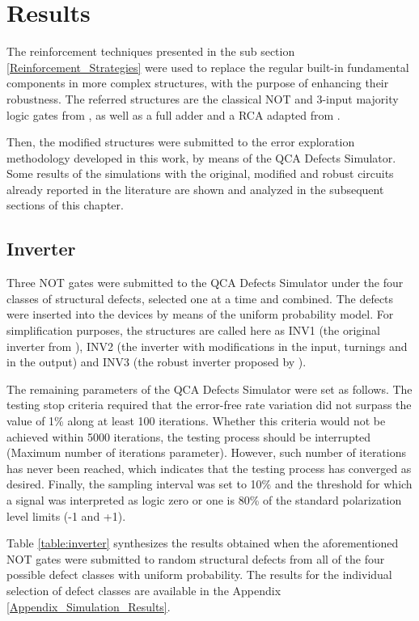 \chapter{Results}
\label{section:Results}

The reinforcement techniques presented in the sub section \ref{Reinforcement_Strategies} were used to replace the regular built-in fundamental components in more complex structures, with the purpose of enhancing their robustness. The referred structures are the classical NOT and 3-input majority logic gates from \cite{tougaw94}, as well as a full adder and a RCA adapted from \cite{bruschi11}.

Then, the modified structures were submitted to the error exploration methodology developed in this work, by means of the QCA Defects Simulator. Some results of the simulations with the original, modified and robust circuits already reported in the literature are shown and analyzed in the subsequent sections of this chapter.  

\section{Inverter}
\label{section:Inverter}

Three NOT gates were submitted to the QCA Defects Simulator under the four classes of structural defects, selected one at a time and combined. The defects were inserted into the devices by means of the uniform probability model. 
For simplification purposes, the structures are called here as INV1 (the original inverter from \cite{tougaw94}), INV2 (the  inverter with modifications in the input, turnings and in the output) and INV3 (the robust inverter proposed by ).

The remaining parameters of the QCA Defects Simulator were set as follows. The testing stop criteria required that the error-free rate variation did not surpass the value of 1\% along at least 100 iterations. Whether this criteria would not be achieved within 5000 iterations, the testing process should be interrupted (Maximum number of iterations parameter). However, such number of iterations has never been reached, which indicates that the testing process has converged as desired. Finally, the sampling interval was set to 10\% and the threshold for which a signal was interpreted as logic zero or one is 80\% of the standard polarization level limits (-1 and +1).

Table \ref{table:inverter} synthesizes the results obtained when the aforementioned NOT gates were submitted to random structural defects from all of the four possible defect classes with uniform probability. The results for the individual selection of defect classes are available in the Appendix \ref{Appendix_Simulation_Results}. 

